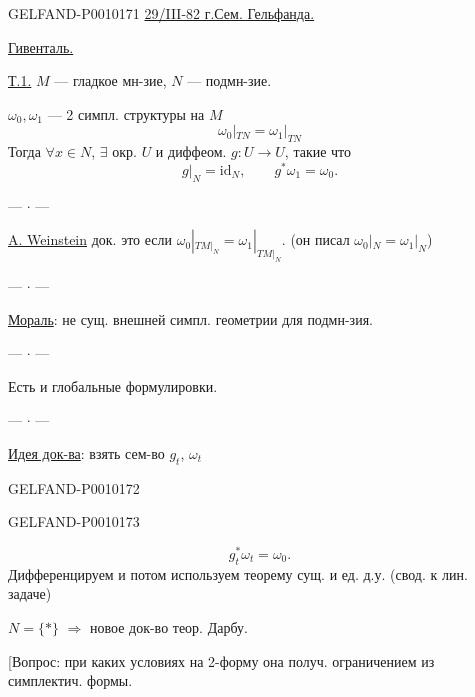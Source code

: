 \begin{GelfandAdjacentEvidence}{GELFAND-P001017}{1}
\underline{29/III-82 г.}\qquad\underline{Сем. Гельфанда.}

\underline{Гивенталь.}

\underline{Т.1.} $M$ --- гладкое мн-зие, $N$ --- подмн-зие.

$\omega_0,\omega_1$ --- 2 симпл. структуры на $M$
\[
\omega_0|_{TN}=\omega_1|_{TN}
\]
Тогда $\forall x\in N$, $\exists$ окр. $U$ и диффеом.
$g:U\to U$, такие что
\[
g|_N=\mathrm{id}_N,\qquad g^*\omega_1=\omega_0.
\]

\begin{center}--- $\cdot$ ---\end{center}
\underline{A. Weinstein} док. это если
$\omega_0|_{TM|_N}=\omega_1|_{TM|_N}$.
(он писал $\omega_0|_N=\omega_1|_N$)

\begin{center}--- $\cdot$ ---\end{center}
\underline{Мораль}: не сущ. внешней симпл. геометрии для подмн-зия.

\begin{center}--- $\cdot$ ---\end{center}
Есть и глобальные формулировки.

\begin{center}--- $\cdot$ ---\end{center}
\underline{Идея док-ва}: взять сем-во $g_t$, $\omega_t$
\end{GelfandAdjacentEvidence}
\begin{GelfandAdjacentEvidence}{GELFAND-P001017}{2}


\end{GelfandAdjacentEvidence}
\begin{GelfandAdjacentEvidence}{GELFAND-P001017}{3}

\[
g_t^*\omega_t=\omega_0.
\]
Дифференцируем и потом используем теорему сущ. и ед. д.у. (свод. к лин. задаче)

$N=\{*\}$ $\Rightarrow$ новое док-во теор. Дарбу.

[Вопрос: при каких условиях на 2-форму она получ. ограничением из симплектич. формы.
\end{GelfandAdjacentEvidence}
